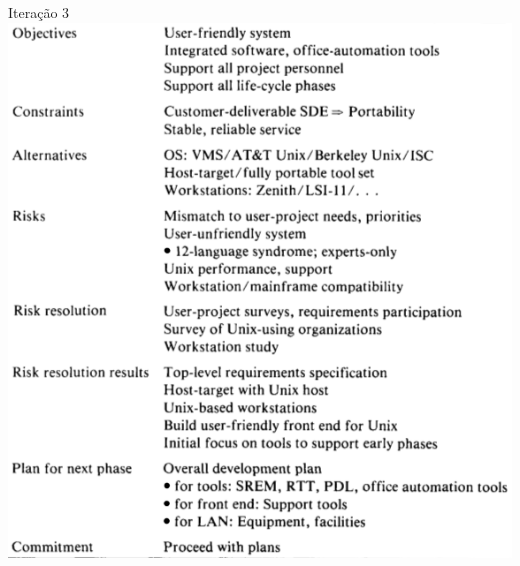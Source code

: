 \begin{frame}
\begin{columns}
		\begin{block:fact}{Iteração 3}
			\centering
			\includegraphics[width=\textwidth]{software-engineering/project-management/process/sdlc/spiral/spiral-trw-round3-riskmanagement}
		\end{block:fact}
	\end{columns}
\end{frame}


